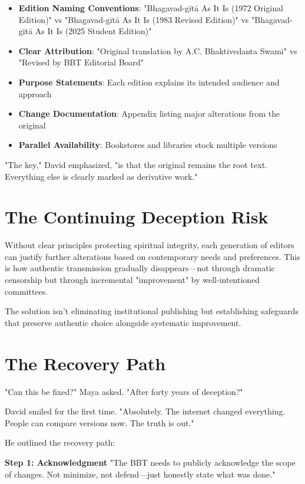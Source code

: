 \documentclass[11pt,twoside]{book}
\begin{document}
\begin{itemize}
\item \textbf{\textbf{Edition Naming Conventions}}: "Bhagavad-gītā As It Is (1972 Original Edition)" vs "Bhagavad-gītā As It Is (1983 Revised Edition)" vs "Bhagavad-gītā As It Is (2025 Student Edition)"
\item \textbf{\textbf{Clear Attribution}}: "Original translation by A.C. Bhaktivedanta Swami" vs "Revised by BBT Editorial Board"
\item \textbf{\textbf{Purpose Statements}}: Each edition explains its intended audience and approach
\item \textbf{\textbf{Change Documentation}}: Appendix listing major alterations from the original
\item \textbf{\textbf{Parallel Availability}}: Bookstores and libraries stock multiple versions
\end{itemize}

"The key," David emphasized, "is that the original remains the root text. Everything else is clearly marked as derivative work."
\section*{The Continuing Deception Risk}
\label{sec:org2b739bd}

Without clear principles protecting spiritual integrity, each generation of editors can justify further alterations based on contemporary needs and preferences. This is how authentic transmission gradually disappears—not through dramatic censorship but through incremental "improvement" by well-intentioned committees.

The solution isn't eliminating institutional publishing but establishing safeguards that preserve authentic choice alongside systematic improvement.
\section*{The Recovery Path}
\label{sec:org23d9da3}

"Can this be fixed?" Maya asked. "After forty years of deception?"

David smiled for the first time. "Absolutely. The internet changed everything. People can compare versions now. The truth is out."

He outlined the recovery path:

\textbf{\textbf{Step 1: Acknowledgment}}
"The BBT needs to publicly acknowledge the scope of changes. Not minimize, not defend—just honestly state what was done."
\end{document}
